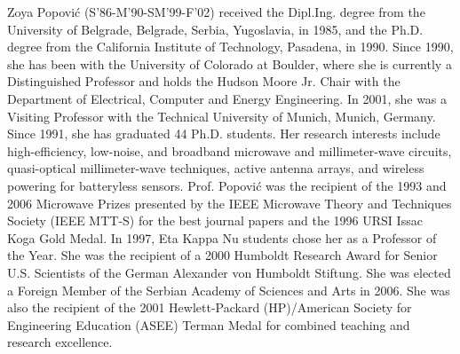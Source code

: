 \begin{IEEEbiography}{Zoya Popovi\'c}
(S'86-M'90-SM'99-F'02) received the Dipl.Ing. degree from the University of Belgrade, Belgrade, Serbia, Yugoslavia, in 1985, and the Ph.D. degree from the California Institute of Technology, Pasadena, in 1990.
Since 1990, she has been with the University of Colorado at Boulder, where she is currently a Distinguished Professor and holds the Hudson Moore Jr. Chair with the Department of Electrical, Computer and Energy Engineering. In 2001, she was a Visiting Professor with the Technical University of Munich, Munich, Germany. 
Since 1991, she has graduated 44 Ph.D. students. Her research interests include high-efficiency, low-noise, and broadband microwave and millimeter-wave circuits, quasi-optical millimeter-wave techniques, active
antenna arrays, and wireless powering for batteryless sensors.
Prof. Popovi\'c was the recipient of the 1993 and 2006 Microwave Prizes presented by the IEEE Microwave Theory and Techniques Society (IEEE MTT-S) for the best journal papers and the 1996 URSI Issac Koga Gold Medal. In 1997, Eta Kappa Nu students chose her as a Professor of the Year. She was the recipient of a 2000 Humboldt Research Award for Senior U.S. Scientists of the German Alexander von Humboldt Stiftung. She was elected a Foreign Member of the Serbian Academy of Sciences and Arts in 2006. She was also the recipient of the 2001 Hewlett-Packard (HP)/American Society for Engineering Education (ASEE) Terman Medal for combined teaching and research excellence.
\end{IEEEbiography}


